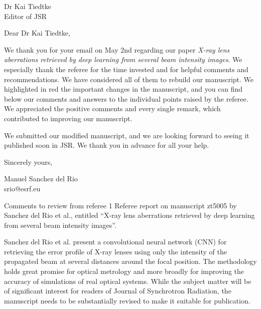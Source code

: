 \documentclass[11pt]{letter} %
\begin{document}
 

\begin{letter}{} %

Dr Kai Tiedtke\\
Editor of JSR\\

\opening{Dear Dr Kai Tiedtke,}

We thank you for your email on May 2nd regarding our paper \textit{X-ray lens aberrations retrieved by deep learning from several beam intensity images}. We especially thank the referee for the time invested and for helpful comments and recommendations. We have considered all of them to rebuild our manuscript. We highlighted in red the important changes in the manuscript, and you can find below our comments and answers to the individual points raised by the referee. We appreciated the positive comments and every single remark, which contributed to improving our manuscript. 

We submitted our modified manuscript, and we are looking forward to seeing it published soon in JSR. We thank you in advance for all your help.


\closing{Sincerely yours,}



Manuel Sanchez del Rio\\srio@esrf.eu



\newpage


Comments to review from referee 1
Referee report on manuscript zt5005 by Sanchez del Rio et al., entitled “X-ray lens aberrations retrieved by deep learning from several beam intensity images”.

Sanchez del Rio et al. present a convolutional neural network (CNN) for retrieving the error profile of X-ray lenses using only the intensity of the propagated beam at several distances around the focal position. The methodology holds great promise for optical metrology and more broadly for improving the accuracy of simulations of real optical systems. While the subject matter will be of significant interest for readers of Journal of Synchrotron Radiation, the manuscript needs to be substantially revised to make it suitable for publication.


\end{letter}
\end{document}
